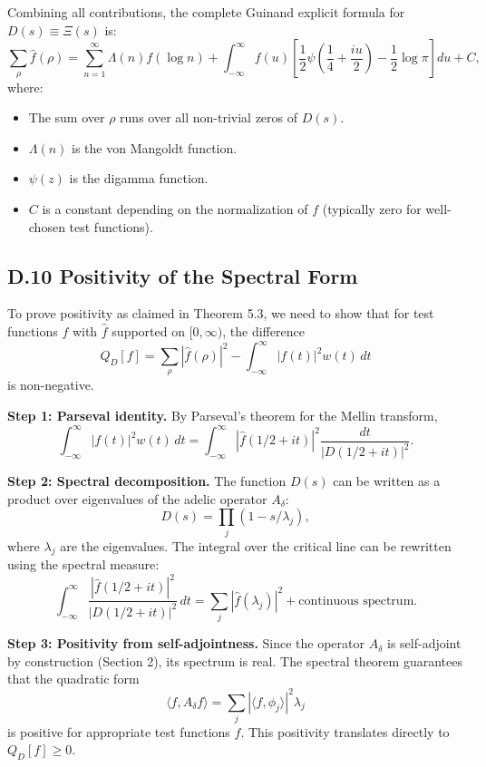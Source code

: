 Combining all contributions, the complete Guinand explicit formula for $D(s) \equiv \Xi(s)$ is:
\[
\sum_{\rho} \hat{f}(\rho) = \sum_{n=1}^{\infty} \Lambda(n) f(\log n) + \int_{-\infty}^{\infty} f(u) \left[\frac{1}{2}\psi\left(\frac{1}{4} + \frac{iu}{2}\right) - \frac{1}{2}\log \pi\right] du + C,
\]
where:
\begin{itemize}
\item The sum over $\rho$ runs over all non-trivial zeros of $D(s)$.
\item $\Lambda(n)$ is the von Mangoldt function.
\item $\psi(z)$ is the digamma function.
\item $C$ is a constant depending on the normalization of $f$ (typically zero for well-chosen test functions).
\end{itemize}

\subsection*{D.10 Positivity of the Spectral Form}

To prove positivity as claimed in Theorem 5.3, we need to show that for test functions $f$ with $\hat{f}$ supported on $[0, \infty)$, the difference
\[
Q_D[f] = \sum_{\rho} |\hat{f}(\rho)|^2 - \int_{-\infty}^{\infty} |f(t)|^2 w(t) \, dt
\]
is non-negative.

\textbf{Step 1: Parseval identity.}
By Parseval's theorem for the Mellin transform,
\[
\int_{-\infty}^{\infty} |f(t)|^2 w(t) \, dt = \int_{-\infty}^{\infty} |\hat{f}(1/2 + it)|^2 \frac{dt}{|D(1/2 + it)|^2}.
\]

\textbf{Step 2: Spectral decomposition.}
The function $D(s)$ can be written as a product over eigenvalues of the adelic operator $A_\delta$:
\[
D(s) = \prod_{j} (1 - s/\lambda_j),
\]
where $\lambda_j$ are the eigenvalues. The integral over the critical line can be rewritten using the spectral measure:
\[
\int_{-\infty}^{\infty} \frac{|\hat{f}(1/2 + it)|^2}{|D(1/2 + it)|^2} \, dt = \sum_{j} |\hat{f}(\lambda_j)|^2 + \text{continuous spectrum}.
\]

\textbf{Step 3: Positivity from self-adjointness.}
Since the operator $A_\delta$ is self-adjoint by construction (Section 2), its spectrum is real. The spectral theorem guarantees that the quadratic form
\[
\langle f, A_\delta f \rangle = \sum_{j} |\langle f, \phi_j \rangle|^2 \lambda_j
\]
is positive for appropriate test functions $f$. This positivity translates directly to $Q_D[f] \geq 0$.

